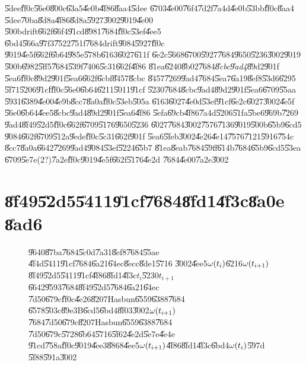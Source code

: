 \U{5dee}\U{ff0c}\U{56e0}\U{800c}\U{63a5}\U{4e0b}\U{4f86}\U{8aa4}\U{5dee}%
\U{6703}\U{4e00}\U{76f4}\U{7d2f}\U{7a4d}\U{4e0b}\U{53bb}\U{ff0c}\U{8aa4}%
\U{5dee}\U{70ba}\U{8d8a}\U{4f86}\U{8d8a}\U{5927}\U{3002}\U{9019}\U{4e00}%
\U{500b}drift\U{662f}\U{66f4}\U{91cd}\U{8981}\U{7684}\U{ff0c}\U{53ef}\U{4ee5}%
\U{6bd4}\U{566a}\U{97f3}\U{7522}\U{751f}\U{7684}drift\U{9084}\U{5927}\U{ff0c}%
\U{9019}\U{4e5f}\U{662f}\U{6b64}\U{985e}\U{578b}\U{6163}\U{6027}\U{611f}%
\U{6e2c}\U{5668}\U{6700}\U{5927}\U{7684}\U{9650}\U{5236}\U{3002}\U{9019}%
\U{500b}\U{6982}\U{5ff5}\U{7684}\U{539f}\U{7406}\U{5c31}\U{662f}\U{4f86}%
\U{81ea}\U{6240}\U{8b02}\U{7684}\textit{\U{8cbc}\U{9ad4}}\U{89d2}\U{901f}%
\U{5ea6}\U{ff0c}\U{89d2}\U{901f}\U{5ea6}\U{662f}\U{6cbf}\U{8457}\U{8cbc}%
\U{8457}\U{7269}\U{9ad4}\U{7684}\U{5ea7}\U{6a19}\U{8ef8}\U{53d6}\U{6295}%
\U{5f71}\U{5206}\U{91cf}\U{ff0c}\U{56e0}\U{6b64}\U{6211}\U{5011}\U{91cf}%
\U{5230}\U{7684}\U{8cbc}\U{9ad4}\U{89d2}\U{901f}\U{5ea6}\U{6709}\U{55aa}%
\U{5931}\U{6389}\U{4e00}\U{4e9b}\U{8cc7}\U{8a0a}\U{ff0c}\U{53eb}\U{505a}%
\U{6163}\U{6027}\U{4e0d}\U{53ef}\U{91cf}\U{6e2c}\U{6027}\U{3002}\U{4e5f}%
\U{56e0}\U{6b64}\U{4ee5}\U{8cbc}\U{9ad4}\U{89d2}\U{901f}\U{5ea6}\U{4f86}%
\U{5efa}\U{69cb}\U{4f86}\U{7a4d}\U{5206}\U{51fa}\U{5be6}\U{969b}\U{7269}%
\U{9ad4}\U{8f49}\U{52d5}\U{ff0c}\U{662f}\U{6709}\U{5176}\U{9650}\U{5236}%
\U{6027}\U{7684}\U{3002}\U{7576}\U{7136}\U{9019}\U{500b}\U{65b9}\U{6cd5}%
\U{9084}\U{662f}\U{6709}\U{512a}\U{9ede}\U{ff0c}\U{5c31}\U{662f}\U{901f}%
\U{5ea6}\U{5feb}\U{3002}\U{4e26}\U{4e14}\U{7576}\U{7121}\U{5916}\U{754c}%
\U{8cc7}\U{8a0a}\U{6642}\U{7269}\U{9ad4}\U{9084}\U{53ef}\U{5224}\U{65b7}%
\U{81ea}\U{8eab}\U{7684}\U{59ff}\U{614b}\U{7684}\U{65b9}\U{6cd5}\U{53ea}%
\U{6709}\U{5e7e}(2?)\U{7a2e}\U{ff0c}\U{9019}\U{4e5f}\U{662f}\U{5176}\U{4e2d}%
\U{7684}\U{4e00}\U{7a2e}\U{3002}

\bigskip

\section{\U{8f49}\U{52d5}\U{5411}\U{91cf}\U{7684}\U{8fd1}\U{4f3c}\U{8a0e}%
\U{8ad6}}

\begin{figure}[th]
\caption{\U{9640}\U{87ba}\U{7684}\U{5c0d}\U{7a31}\U{8ef8}\U{7684}\U{55ae}%
\U{4f4d}\U{5411}\U{91cf}\U{7684}\U{6a21}\U{64ec}\U{8ecc}\U{8de1}\U{5716}%
\U{3002}\U{4ee5}$\protect\omega (t_{i})$\U{6216}$\protect\omega (t_{i+1})$%
\U{8f49}\U{52d5}\U{5411}\U{91cf}\U{4f86}\U{8fd1}\U{4f3c}$t_{i}$\U{5230}$%
t_{i+1}$\U{6642}\U{9593}\U{7684}\U{8f49}\U{52d5}\U{7684}\U{6a21}\U{64ec}%
\U{7d50}\U{679c}\U{ff0c}\U{4e26}\U{8207}Hasbun\U{6559}\U{6388}\U{7684}%
\U{6578}\U{503c}\U{89e3}B\U{6cd5}\U{6bd4}\U{8f03}\U{3002}$\protect\omega %
(t_{i+1})$\U{7684}\U{7d50}\U{679c}\U{8207}Hasbun\U{6559}\U{6388}\U{7684}%
\U{7d50}\U{679c}\U{5728}\U{6b64}\U{5716}\U{5f62}\U{4e2d}\U{5e7e}\U{4e4e}%
\U{91cd}\U{758a}\U{ff0c}\U{9019}\U{4ee3}\U{8868}\U{4ee5}$\protect\omega %
(t_{i+1})$\U{4f86}\U{8fd1}\U{4f3c}\U{6bd4}$\protect\omega (t_{i})$\U{597d}%
\U{5f88}\U{591a}\U{3002}}
\begin{center}
\fbox{}
\end{center}
\end{figure}

